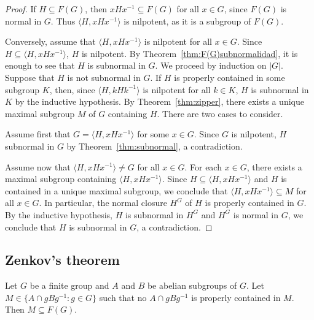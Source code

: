 \begin{proof}
	If $H\subseteq F(G)$, then $xHx^{-1}\subseteq F(G)$ for all $x\in G$, since
	$F(G)$ is normal in $G$. Thus $\langle H,xHx^{-1}\rangle$ is nilpotent, as it
	is a subgroup of $F(G)$.

	Conversely, assume that $\langle H,xHx^{-1}\rangle$ is nilpotent for all  $x\in
	G$. Since $H\subseteq \langle H,xHx^{-1}\rangle$, $H$ is nilpotent. By
	Theorem~\ref{thm:F(G)subnormalidad}, it is enough to see that $H$ is subnormal
	in $G$. We proceed by induction on $|G|$. Suppose that $H$ is not subnormal in
	$G$. If $H$ is properly contained in some subgroup $K$, then, since $\langle
	H,kHk^{-1}\rangle$ is nilpotent for all $k\in K$, $H$ is subnormal in $K$ by
	the inductive hypothesis. By Theorem~\ref{thm:zipper}, there exists a unique
	maximal subgroup $M$ of $G$ containing $H$. There are two cases to consider.
    
    Assume first that $G=\langle H,xHx^{-1}\rangle$ for some $x\in G$. Since $G$
    is nilpotent, $H$ subnormal in $G$ by Theorem~\ref{thm:subnormal}, a
    contradiction. 

    Assume now that $\langle H,xHx^{-1}\rangle\ne G$ for all $x\in G$. For each 
	$x\in G$, there exists a maximal subgroup containing $\langle
	H,xHx^{-1}\rangle$. Since $H\subseteq \langle H,xHx^{-1}\rangle$ and $H$
	is contained in a unique maximal subgroup, we conclude that $\langle
	H,xHx^{-1}\rangle\subseteq M$ for all $x\in G$. In particular, the normal closure 
	$H^G$ of $H$ is properly contained in $G$. By the inductive hypothesis, 
	$H$ is subnormal in $H^G$ and $H^G$ is normal in $G$, we conclude that 
	$H$ is subnormal in $G$, a contradiction. 
\end{proof}

\subsection{Zenkov's theorem}

\begin{theorem}[Zenkov]
    \label{thm:Zenkov}
    Let $G$ be a finite group and $A$ and $B$ be abelian subgroups of $G$. Let
    $M\in\{A\cap gBg^{-1}:g\in G\}$ such that no $A\cap gBg^{-1}$ is properly
    contained in $M$. Then $M\subseteq F(G)$.
\end{theorem}


